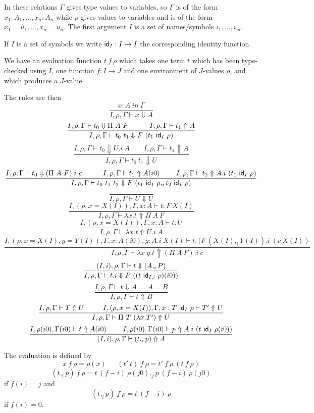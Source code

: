 \documentclass[10pt,a4paper]{article}
\newcommand{\ID}{{\sf id}}
\begin{document}
 In these relations $\Gamma$ gives type values to variables, so $\Gamma$ is of the form
$x_1:A_1,\dots,x_n:A_n$ while $\rho$ gives values to variables and is of the form
$x_1 = u_1,\dots,x_n=u_n$. The first argument $I$ is a set of names/symbols
$i_1,\dots,i_m$. 

 If $I$ is a set of symbols we write $\ID_I:I\rightarrow I$ the corresponding identity function.

 We have an evaluation function $t~f~\rho$ which takes one term $t$ which has been type-checked
using $I$, one function $f:I\rightarrow J$ and one environment of $J$-values $\rho$, and which produces
a $J$-value.

 The rules are then
$$
\frac{x:A~in~\Gamma}{I,\rho,\Gamma\vdash x\Downarrow A}
$$
$$
\frac{I,\rho,\Gamma\vdash t_0\Downarrow\Pi~A~F~~~~~~~~~I,\rho,\Gamma\vdash t_1\Uparrow A}
     {I,\rho,\Gamma\vdash t_0~t_1\Downarrow F~(t_1~\ID_I~\rho)}
$$
$$
\frac{I,\rho,\Gamma\vdash t_0\Downarrow U.i~A~~~~~~~~~I,\rho,\Gamma\vdash t_1\Uparrow A}
     {I,\rho,\Gamma\vdash t_0~t_1\Downarrow U}
$$
$$
\frac{I,\rho,\Gamma\vdash t_0\Downarrow (\Pi~A~F).i~c~~~~~~~~~
      I,\rho,\Gamma\vdash t_1\Uparrow A(i0)~~~~~~~
      I,\rho,\Gamma\vdash t_2\Uparrow A.i~(t_1~\ID_I~\rho)}
     {I,\rho,\Gamma\vdash t_0~t_1~t_2\Downarrow F~(t_1~\ID_I~\rho,_i t_2~\ID_I~\rho)}
$$
$$
\frac{}{I,\rho,\Gamma\vdash U\Downarrow U}
$$
$$
\frac{I,(\rho,x=X(I)),\Gamma,x:A\vdash t:F~X(I)}{I,\rho,\Gamma\vdash \lambda x.t\Uparrow \Pi~A~F}
$$
$$
\frac{I,(\rho,x=X(I)),\Gamma,x:A\vdash t:U}{I,\rho,\Gamma\vdash \lambda x.t\Uparrow U.i~A}
$$
$$
\frac{I,(\rho,x=X(I),y=Y(I)),\Gamma,x:A(i0),y:A.i~X(I)\vdash t:(F~(X(I),_i Y(I)).i~(c~X(I))}
     {I,\rho,\Gamma\vdash \lambda x~y.t\Uparrow (\Pi~A~F).i~c}
$$
$$
\frac{(I,i),\rho,\Gamma\vdash t\Downarrow (A,_i P)}
     {I,\rho,\Gamma\vdash t.i\Downarrow P~((t~\ID_{I,i}~\rho)(i0))}
$$
$$
\frac{I,\rho,\Gamma\vdash t\Downarrow A~~~~~~~A = B}{I,\rho,\Gamma\vdash t\Uparrow B}
$$
$$
\frac{I,\rho,\Gamma\vdash T\Uparrow U~~~~~~~~I,(\rho,x=X(I)),\Gamma,x:T~\ID_I~\rho\vdash T'\Uparrow U}
     {I,\rho,\Gamma\vdash \Pi~T~(\lambda x.T')\Uparrow U}
$$
$$
\frac{I,\rho(i0),\Gamma(i0)\vdash t\Uparrow A(i0)~~~~~~~I,\rho(i0),\Gamma(i0)\vdash p\Uparrow A.i~(t~\ID_I~\rho(i0))}
     {(I,i),\rho,\Gamma\vdash (t,_i p)\Uparrow A}
$$

 The evaluation is defined by
$$
x~f~\rho = \rho(x)~~~~~~~(t'~t)~f~\rho = t'~f~\rho~(t~f~\rho)
$$
$$
(t,_i p)~f~\rho = t~(f-i)~\rho(j0),_j p~(f-i)~\rho(j0)
$$
if $f(i) = j$ and 
$$
(t,_i p)~f~\rho = t~(f-i)~\rho
$$
if $f(i) = 0$.
\end{document}
